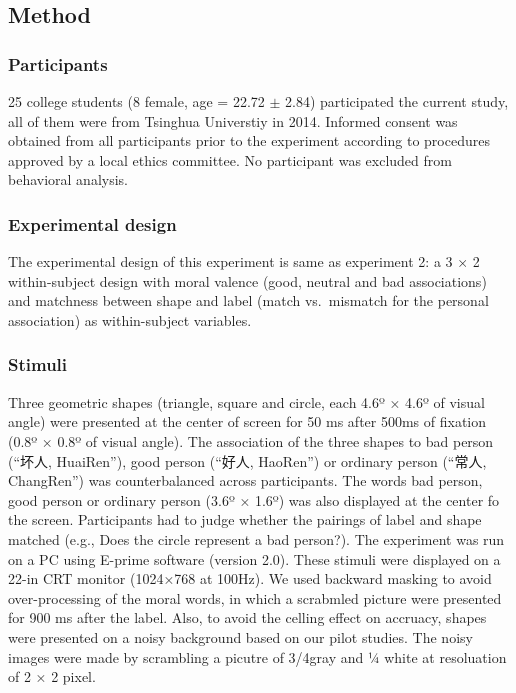\documentclass[man]{apa6}
\begin{document}
\hypertarget{method-7}{%
\subsection{Method}\label{method-7}}

\hypertarget{participants-9}{%
\subsubsection{Participants}\label{participants-9}}

25 college students (8 female, age = 22.72 \(\pm\) 2.84) participated the current study, all of them were from Tsinghua Universtiy in 2014. Informed consent was obtained from all participants prior to the experiment according to procedures approved by a local ethics committee. No participant was excluded from behavioral analysis.

\hypertarget{experimental-design-3}{%
\subsubsection{Experimental design}\label{experimental-design-3}}

The experimental design of this experiment is same as experiment 2: a 3 × 2 within-subject design with moral valence (good, neutral and bad associations) and matchness between shape and label (match vs.~mismatch for the personal association) as within-subject variables.

\hypertarget{stimuli-4}{%
\subsubsection{Stimuli}\label{stimuli-4}}

Three geometric shapes (triangle, square and circle, each 4.6º × 4.6º of visual angle) were presented at the center of screen for 50 ms after 500ms of fixation (0.8º × 0.8º of visual angle). The association of the three shapes to bad person (\enquote{坏人, HuaiRen}), good person (\enquote{好人, HaoRen}) or ordinary person (\enquote{常人, ChangRen}) was counterbalanced across participants. The words bad person, good person or ordinary person (3.6º × 1.6º) was also displayed at the center fo the screen. Participants had to judge whether the pairings of label and shape matched (e.g., Does the circle represent a bad person?). The experiment was run on a PC using E-prime software (version 2.0). These stimuli were displayed on a 22-in CRT monitor (1024×768 at 100Hz).
We used backward masking to avoid over-processing of the moral words, in which a scrabmled picture were presented for 900 ms after the label. Also, to avoid the celling effect on accruacy, shapes were presented on a noisy background based on our pilot studies. The noisy images were made by scrambling a picutre of 3/4gray and ¼ white at resoluation of 2 × 2 pixel.
\end{document}
